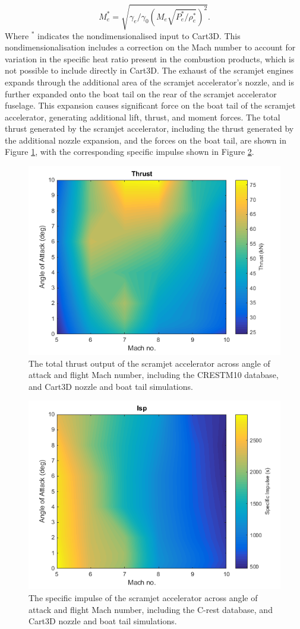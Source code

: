 \begin{equation}
M_e^* = \sqrt{\gamma_e/\gamma_0 (M_e \sqrt{ P_e^*/\rho_e^*})^2}.
\end{equation}
Where $^*$ indicates the nondimensionalised input to Cart3D. This nondimensionalisation includes a correction on the Mach number to account for variation in the specific heat ratio present in the combustion products, which is not possible to include directly in Cart3D\cite{Mehta2016}. The exhaust of the scramjet engines expands through the additional area of the scramjet accelerator's nozzle, and is further expanded onto the boat tail on the rear of the scramjet accelerator fuselage. This expansion causes significant force on the boat tail of the scramjet accelerator, generating additional lift, thrust, and moment forces. The total thrust generated by the scramjet accelerator, including the thrust generated by the additional nozzle expansion, and the forces on the boat tail, are shown in Figure \ref{fig:Thrust}, with the corresponding specific impulse shown in Figure \ref{fig:Isp}.
\begin{figure}[ht]
	\centering
	\includegraphics[width=0.6\linewidth]{figures/3_vehicle_design/Thrust}
	\caption{The total thrust output of the scramjet accelerator across angle of attack and flight Mach number, including the CRESTM10 database, and Cart3D nozzle and boat tail simulations.}
	\label{fig:Thrust}
\end{figure}
\begin{figure}[ht]
	\centering
	\includegraphics[width=0.6\linewidth]{figures/3_vehicle_design/Isp}
	\caption{The specific impulse of the scramjet accelerator across angle of attack and flight Mach number, including the C-rest database, and Cart3D nozzle and boat tail simulations.}
	\label{fig:Isp}
\end{figure}



